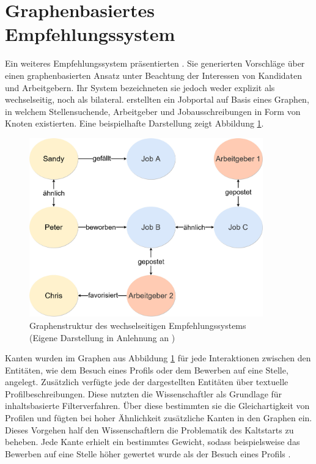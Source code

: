 \section{Graphenbasiertes Empfehlungssystem}
\label{ch:verwandteArbeiten:nichtAufDemPEFitBasierendeBilateraleSysteme:lu:2013}
Ein weiteres Empfehlungssystem präsentierten \textcite[S. 1ff.]{lu:2013}. Sie generierten Vorschläge über einen graphenbasierten Ansatz unter Beachtung der Interessen von Kandidaten und Arbeitgebern. Ihr System bezeichneten sie jedoch weder explizit als wechselseitig, noch als bilateral. \textcite[S. 1ff.]{lu:2013} erstellten ein Jobportal auf Basis eines Graphen, in welchem Stellensuchende, Arbeitgeber und Jobausschreibungen in Form von Knoten existierten. Eine beispielhafte Darstellung zeigt Abbildung \ref{fig:verwandteArbeiten:nichtAufDemPEFitBasierendeBilateraleSysteme:lu:2013:abb1}.

\begin{figure}[h]
	\centering
	\includegraphics[width=0.9\textwidth]{gfx/lu-graph.jpg}
	\caption[Graphenstruktur des wechselseitigen Empfehlungssystems]{Graphenstruktur des wechselseitigen Empfehlungssystems\\
		(Eigene Darstellung in Anlehnung an \cite[S. 2]{lu:2013})}
	\label{fig:verwandteArbeiten:nichtAufDemPEFitBasierendeBilateraleSysteme:lu:2013:abb1}
\end{figure}

Kanten wurden im Graphen aus Abbildung \ref{fig:verwandteArbeiten:nichtAufDemPEFitBasierendeBilateraleSysteme:lu:2013:abb1} für jede Interaktionen zwischen den Entitäten, wie dem Besuch eines Profils oder dem Bewerben auf eine Stelle, angelegt. Zusätzlich verfügte jede der dargestellten Entitäten über textuelle Profilbeschreibungen. Diese nutzten die Wissenschaftler als Grundlage für inhaltsbasierte Filterverfahren. Über diese bestimmten sie die Gleichartigkeit von Profilen und fügten bei hoher Ähnlichkeit zusätzliche Kanten in den Graphen ein. Dieses Vorgehen half den Wissenschaftlern die Problematik des Kaltstarts zu beheben. Jede Kante erhielt ein bestimmtes Gewicht, sodass beispielsweise das Bewerben auf eine Stelle höher gewertet wurde als der Besuch eines Profils \cite[S. 1ff.]{lu:2013}.

